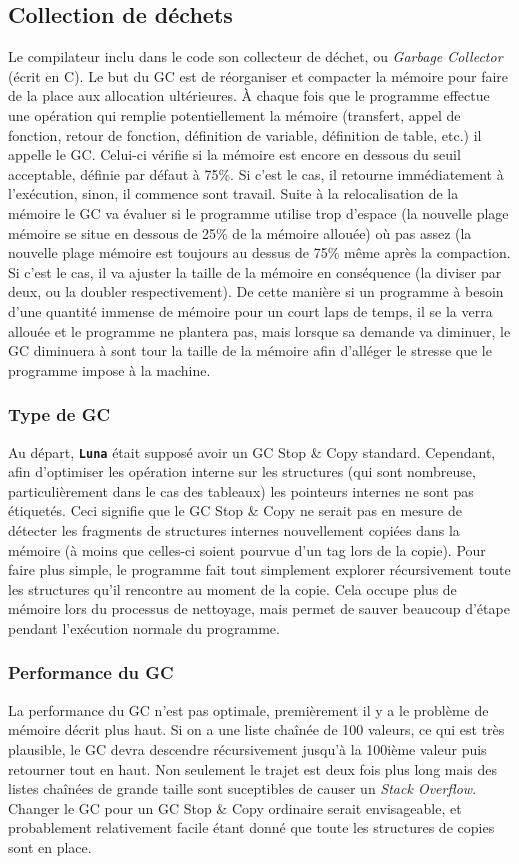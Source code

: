 \documentclass{article}
\newcommand{\luna}{\textbf{\texttt{Luna}}}
\begin{document}
\subsection{Collection de déchets}
Le compilateur inclu dans le code son collecteur de déchet, ou \textit{Garbage Collector} (écrit en C). Le but du GC est de réorganiser et compacter la mémoire pour faire de la place aux allocation ultérieures. À chaque fois que le programme effectue une opération qui remplie potentiellement la mémoire (transfert, appel de fonction, retour de fonction, définition de variable, définition de table, etc.) il appelle le GC. Celui-ci vérifie si la mémoire est encore en dessous du seuil acceptable, définie par défaut à 75\%{}. Si c'est le cas, il retourne immédiatement à l'exécution, sinon, il commence sont travail. Suite à la relocalisation de la mémoire le GC va évaluer si le programme utilise trop d'espace (la nouvelle plage mémoire se situe en dessous de 25\%{} de la mémoire allouée) où pas assez (la nouvelle plage mémoire est toujours au dessus de 75\%{} même après la compaction. Si c'est le cas, il va ajuster la taille de la mémoire en conséquence (la diviser par deux, ou la doubler respectivement). De cette manière si un programme à besoin d'une quantité immense de mémoire pour un court laps de temps, il se la verra allouée et le programme ne plantera pas, mais lorsque sa demande va diminuer, le GC diminuera à sont tour la taille de la mémoire afin d'alléger le stresse que le programme impose à la machine.

\subsubsection{Type de GC}
Au départ, \luna{} était supposé avoir un GC Stop \&{} Copy standard. Cependant, afin d'optimiser les opération interne sur les structures (qui sont nombreuse, particulièrement dans le cas des tableaux) les pointeurs internes ne sont pas étiquetés. Ceci signifie que le GC Stop \&{} Copy ne serait pas en mesure de détecter les fragments de structures internes nouvellement copiées dans la mémoire (à moins que celles-ci soient pourvue d'un tag lors de la copie). Pour faire plus simple, le programme fait tout simplement explorer récursivement toute les structures qu'il rencontre au moment de la copie. Cela occupe plus de mémoire lors du processus de nettoyage, mais permet de sauver beaucoup d'étape pendant l'exécution normale du programme.

\subsubsection{Performance du GC}
La performance du GC n'est pas optimale, premièrement il y a le problème de mémoire décrit plus haut. Si on a une liste chaînée de 100 valeurs, ce qui est très plausible, le GC devra descendre récursivement jusqu'à la 100ième valeur puis retourner tout en haut. Non seulement le trajet est deux fois plus long mais des listes chaînées de grande taille sont suceptibles de causer un \textit{Stack Overflow}. Changer le GC pour un GC Stop \&{} Copy ordinaire serait envisageable, et probablement relativement facile étant donné que toute les structures de copies sont en place.
\end{document}
